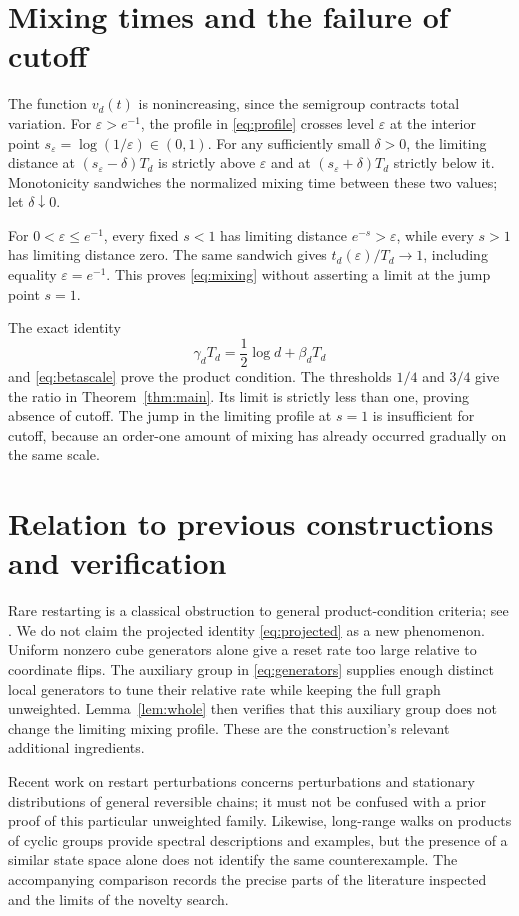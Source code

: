\documentclass[11pt]{article}
\theoremstyle{remark}\newtheorem{remark}[theorem]{Remark}
\begin{document}
\section{Mixing times and the failure of cutoff}
The function $v_d(t)$ is nonincreasing, since the semigroup contracts total variation. For $\varepsilon>e^{-1}$, the profile in \eqref{eq:profile} crosses level $\varepsilon$ at the interior point $s_\varepsilon=\log(1/\varepsilon)\in(0,1)$. For any sufficiently small $\delta>0$, the limiting distance at $(s_\varepsilon-\delta)T_d$ is strictly above $\varepsilon$ and at $(s_\varepsilon+\delta)T_d$ strictly below it. Monotonicity sandwiches the normalized mixing time between these two values; let $\delta\downarrow0$.

For $0<\varepsilon\le e^{-1}$, every fixed $s<1$ has limiting distance $e^{-s}>\varepsilon$, while every $s>1$ has limiting distance zero. The same sandwich gives $t_d(\varepsilon)/T_d\to1$, including equality $\varepsilon=e^{-1}$. This proves \eqref{eq:mixing} without asserting a limit at the jump point $s=1$.

The exact identity
\[
 \gamma_dT_d=\frac12\log d+\beta_dT_d
\]
and \eqref{eq:betascale} prove the product condition. The thresholds $1/4$ and $3/4$ give the ratio in Theorem~\ref{thm:main}. Its limit is strictly less than one, proving absence of cutoff. The jump in the limiting profile at $s=1$ is insufficient for cutoff, because an order-one amount of mixing has already occurred gradually on the same scale.

\section{Relation to previous constructions and verification}
Rare restarting is a classical obstruction to general product-condition criteria; see \cite{LPW,SalezCurvature}. We do not claim the projected identity \eqref{eq:projected} as a new phenomenon. Uniform nonzero cube generators alone give a reset rate too large relative to coordinate flips. The auxiliary group in \eqref{eq:generators} supplies enough distinct local generators to tune their relative rate while keeping the full graph unweighted. Lemma~\ref{lem:whole} then verifies that this auxiliary group does not change the limiting mixing profile. These are the construction's relevant additional ingredients.

Recent work on restart perturbations \cite{Vial} concerns perturbations and stationary distributions of general reversible chains; it must not be confused with a prior proof of this particular unweighted family. Likewise, long-range walks on products of cyclic groups \cite{GM} provide spectral descriptions and examples, but the presence of a similar state space alone does not identify the same counterexample. The accompanying comparison records the precise parts of the literature inspected and the limits of the novelty search.
\end{document}
